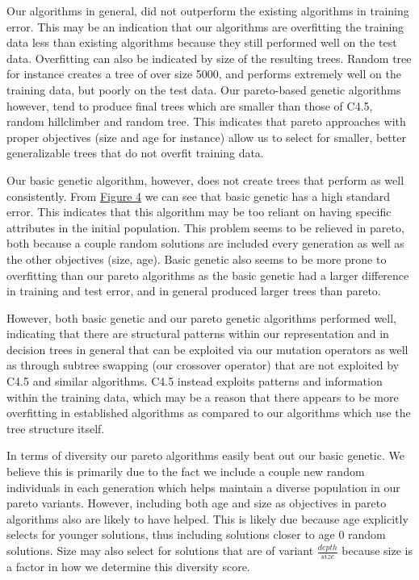 \documentclass{acm_proc_article-sp}
\begin{document}
Our algorithms in general, did not outperform the existing algorithms in training error. This may be an indication that our algorithms are overfitting the training data less than existing algorithms because they still performed well on the test data. Overfitting can also be indicated by size of the resulting trees. Random tree for instance creates a tree of over size 5000, and performs extremely well on the training data, but poorly on the test data. Our pareto-based genetic algorithms however, tend to produce final trees which are smaller than those of C4.5, random hillclimber and random tree. This indicates that pareto approaches with proper objectives (size and age for instance) allow us to select for smaller, better generalizable trees that do not overfit training data.

Our basic genetic algorithm, however, does not create trees that perform as well consistently. From \hyperref[algorithms]{Figure 4} we can see that basic genetic has a high standard error. This indicates that this algorithm may be too reliant on having specific attributes in the initial population. This problem seems to be relieved in pareto, both because a couple random solutions are included every generation as well as the other objectives (size, age). Basic genetic also seems to be more prone to overfitting than our pareto algorithms as the basic genetic had a larger difference in training and test error, and in general produced larger trees than pareto.

However, both basic genetic and our pareto genetic algorithms performed well, indicating that there are structural patterns within our representation and in decision trees in general that can be exploited via our mutation operators as well as through subtree swapping (our crossover operator) that are not exploited by C4.5 and similar algorithms. C4.5 instead exploits patterns and information within the training data, which may be a reason that there appears to be more overfitting in established algorithms as compared to our algorithms which use the tree structure itself.

In terms of diversity our pareto algorithms easily beat out our basic genetic. We believe this is primarily due to the fact we include a couple new random individuals in each generation which helps maintain a diverse population in our pareto variants. However, including both age and size as objectives in pareto algorithms also are likely to have helped. This is likely due because age explicitly selects for younger solutions, thus including solutions closer to age 0 random solutions. Size may also select for solutions that are of variant $\frac{depth}{size}$ because size is a factor in how we determine this diversity score.
\end{document}
